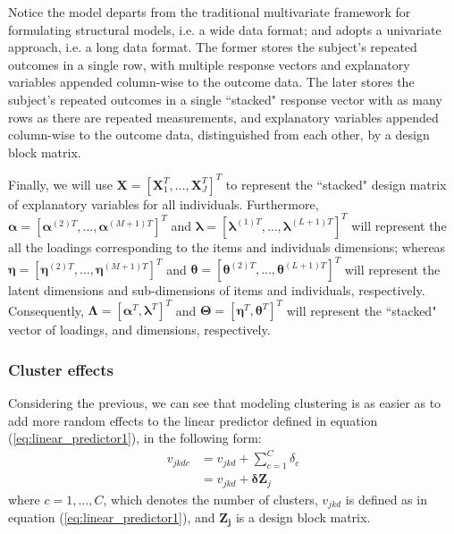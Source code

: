Notice the model departs from the traditional multivariate framework for formulating structural models, i.e. a wide data format; and adopts a univariate approach, i.e. a long data format. The former stores the subject’s repeated outcomes in a single row, with multiple response vectors and explanatory variables appended column-wise to the outcome data. The later stores the subject’s repeated outcomes in a single ``stacked" response vector with as many rows as there are repeated measurements, and explanatory variables appended column-wise to the outcome data, distinguished from each other, by a design block matrix. 

Finally, we will use $\mathbf{X} = [ \mathbf{X}_{1}^{T}, \dots, \mathbf{X}_{J}^{T} ]^{T}$ to represent the ``stacked" design matrix of explanatory variables for all individuals. Furthermore, $\pmb{\alpha} = [ \pmb{\alpha}^{(2)T}, \dots, \pmb{\alpha}^{(M+1)T} ]^{T}$ and $\pmb{\lambda} = [ \pmb{\lambda}^{(1)T}, \dots, \pmb{\lambda}^{(L+1)T} ]^{T}$ will represent the all the loadings corresponding to the items and individuals dimensions; whereas $\pmb{\eta} = [ \pmb{\eta}^{(2)T}, \dots, \pmb{\eta}^{(M+1)T} ]^{T}$ and $\pmb{\theta} = [ \pmb{\theta}^{(2)T}, \dots, \pmb{\theta}^{(L+1)T} ]^{T}$ will represent the latent dimensions and sub-dimensions of items and individuals, respectively. Consequently, $\pmb{\Lambda} = [ \pmb{\alpha}^{T}, \pmb{\lambda}^{T} ]^{T}$ and $\pmb{\Theta} = [ \pmb{\eta}^{T}, \pmb{\theta}^{T} ]^{T}$ will represent the ``stacked" vector of loadings, and dimensions, respectively.


\subsubsection{Cluster effects} \label{ss_sect:clusters}

Considering the previous, we can see that modeling clustering is as easier as to add more random effects to the linear predictor defined in equation (\ref{eq:linear_predictor1}), in the following form:
%
\begin{equation} \label{eq:linear_predictor3}
	\begin{split}
		v_{jkdc} &= v_{jkd} + \sum_{c=1}^{C} \delta_{c}  \\
		&= v_{jkd} + \pmb{\delta} \mathbf{Z}_{j}
	\end{split}
\end{equation}
\noindent where $c=1, \dots, C$, which denotes the number of clusters, $v_{jkd}$ is defined as in equation (\ref{eq:linear_predictor1}), and $\mathbf{Z_{j}}$ is a design block matrix.
	
